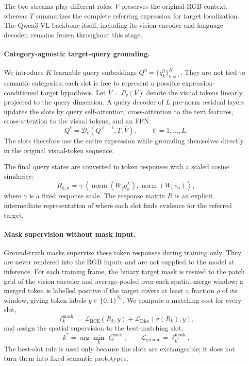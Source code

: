 The two streams play different roles: $V$ preserves the original RGB context, whereas $T$ summarizes the complete referring expression for target localization. The Qwen3-VL backbone itself, including its vision encoder and language decoder, remains frozen throughout this stage.

\paragraph{Category-agnostic target-query grounding.}
We introduce $K$ learnable query embeddings $Q^0=\{q_k^0\}_{k=1}^{K}$. They are not tied to semantic categories; each slot is free to represent a possible expression-conditioned target hypothesis. Let $\bar V=P_v(V)$ denote the visual tokens linearly projected to the query dimension. A query decoder of $L$ pre-norm residual layers updates the slots by query self-attention, cross-attention to the text features, cross-attention to the visual tokens, and an FFN:
\begin{equation}
Q^{\ell}=\mathcal{D}_{\ell}\!\left(Q^{\ell-1},T,\bar V\right),
\qquad \ell=1,\ldots,L .
\end{equation}
The slots therefore use the entire expression while grounding themselves directly in the original visual-token sequence.

The final query states are converted to token responses with a scaled cosine similarity:
\begin{equation}
R_{k,n}
=
\gamma\,
\left\langle
\operatorname{norm}(W_q q_k^{L}),
\operatorname{norm}(W_v \bar v_n)
\right\rangle,
\end{equation}
where $\gamma$ is a fixed response scale. The response matrix $R$ is an explicit intermediate representation of where each slot finds evidence for the referred target.

\paragraph{Mask supervision without mask input.}
Ground-truth masks supervise these token responses during training only. They are never rendered into the RGB inputs and are not supplied to the model at inference. For each training frame, the binary target mask is resized to the patch grid of the vision encoder and average-pooled over each spatial-merge window; a merged token is labelled positive if the target covers at least a fraction $\rho$ of its window, giving token labels $y\in\{0,1\}^{N_v}$. We compute a matching cost for every slot,
\begin{equation}
\ell_k^{\mathrm{mask}}
=
\mathcal{L}_{\mathrm{BCE}}(R_k,y)
+
\mathcal{L}_{\mathrm{Dice}}\!\left(\sigma(R_k),y\right),
\end{equation}
and assign the spatial supervision to the best-matching slot,
\begin{equation}
 k^{*}=\arg\min_k \ell_k^{\mathrm{mask}},
 \qquad
 \mathcal{L}_{\mathrm{ground}}
 =\ell_{k^{*}}^{\mathrm{mask}}.
\end{equation}
The best-slot rule is used only because the slots are exchangeable; it does not turn them into fixed semantic prototypes.

